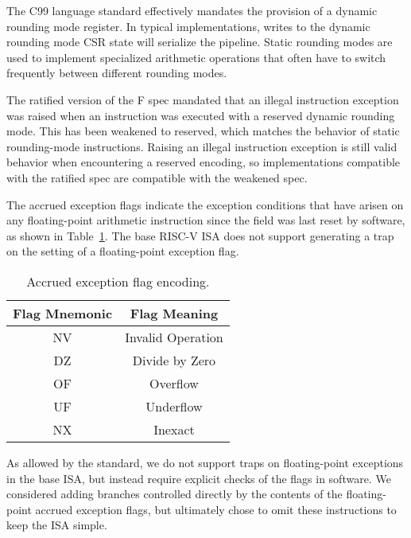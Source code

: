 \begin{commentary}
The C99 language standard effectively mandates the provision of a
dynamic rounding mode register.  In typical implementations, writes to
the dynamic rounding mode CSR state will serialize the pipeline.
Static rounding modes are used to implement specialized arithmetic
operations that often have to switch frequently between different
rounding modes.

The ratified version of the F spec mandated that an illegal
instruction exception was raised when an instruction was executed with
a reserved dynamic rounding mode.  This has been weakened to reserved,
which matches the behavior of static rounding-mode instructions.
Raising an illegal instruction exception is still valid behavior when
encountering a reserved encoding, so implementations compatible with
the ratified spec are compatible with the weakened spec.
\end{commentary}
 
The accrued exception flags indicate the exception conditions that
have arisen on any floating-point arithmetic instruction since the
field was last reset by software, as shown in Table~\ref{bitdef}.
The base RISC-V ISA
does not support generating a trap on the setting of a floating-point
exception flag.

\begin{table}[htp]
\begin{small}
\begin{center}
\begin{tabular}{cl}
\hline
\multicolumn{1}{|c|}{Flag Mnemonic} &
\multicolumn{1}{c|}{Flag Meaning} \\
\hline
\multicolumn{1}{|c|}{NV} &
\multicolumn{1}{c|}{Invalid Operation}\\
\hline
\multicolumn{1}{|c|}{DZ} &
\multicolumn{1}{c|}{Divide by Zero}\\
\hline
\multicolumn{1}{|c|}{OF} &
\multicolumn{1}{c|}{Overflow}\\
\hline
\multicolumn{1}{|c|}{UF} &
\multicolumn{1}{c|}{Underflow}\\
\hline
\multicolumn{1}{|c|}{NX} &
\multicolumn{1}{c|}{Inexact}\\
\hline
\end{tabular}
\end{center}
\end{small}
\caption{Accrued exception flag encoding.}
\label{bitdef}
\end{table}

\begin{commentary}
As allowed by the standard, we do not support traps on floating-point
exceptions in the base ISA, but instead require explicit checks of the flags
in software.  We considered adding branches controlled directly by the
contents of the floating-point accrued exception flags, but ultimately chose
to omit these instructions to keep the ISA simple.
\end{commentary}

